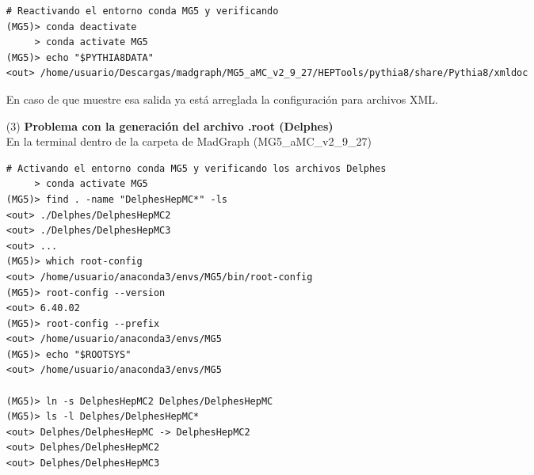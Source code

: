 \begin{itemize}
\begin{lstlisting}
# Reactivando el entorno conda MG5 y verificando
(MG5)> conda deactivate
     > conda activate MG5 
(MG5)> echo "$PYTHIA8DATA"
<out> /home/usuario/Descargas/madgraph/MG5_aMC_v2_9_27/HEPTools/pythia8/share/Pythia8/xmldoc     
\end{lstlisting}
    En caso de que muestre esa salida ya está arreglada la configuración para archivos XML.
    \item[(3)] \textbf{Problema con la generación del archivo .root (Delphes)}\\
    En la terminal dentro de la carpeta de MadGraph (MG5\_aMC\_v2\_9\_27)
    \begin{lstlisting}
# Activando el entorno conda MG5 y verificando los archivos Delphes
     > conda activate MG5
(MG5)> find . -name "DelphesHepMC*" -ls
<out> ./Delphes/DelphesHepMC2
<out> ./Delphes/DelphesHepMC3
<out> ...
(MG5)> which root-config
<out> /home/usuario/anaconda3/envs/MG5/bin/root-config
(MG5)> root-config --version
<out> 6.40.02
(MG5)> root-config --prefix
<out> /home/usuario/anaconda3/envs/MG5
(MG5)> echo "$ROOTSYS"
<out> /home/usuario/anaconda3/envs/MG5

(MG5)> ln -s DelphesHepMC2 Delphes/DelphesHepMC
(MG5)> ls -l Delphes/DelphesHepMC*
<out> Delphes/DelphesHepMC -> DelphesHepMC2
<out> Delphes/DelphesHepMC2
<out> Delphes/DelphesHepMC3


\end{lstlisting}
\end{itemize}

